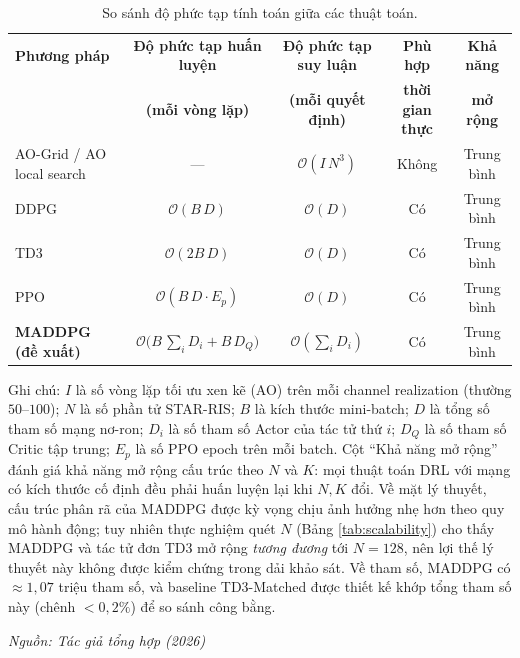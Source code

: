 \begin{table}[t]
\centering
\small
\caption{So sánh độ phức tạp tính toán giữa các thuật toán.}
\label{tab:complexity}
\setlength{\tabcolsep}{4pt}
\begin{tabular}{lcccc}
\toprule
\textbf{Phương pháp} & \textbf{Độ phức tạp huấn luyện} & \textbf{Độ phức tạp suy luận} & \textbf{Phù hợp} & \textbf{Khả năng} \\
                     & \textbf{(mỗi vòng lặp)}           & \textbf{(mỗi quyết định)}      & \textbf{thời gian thực} & \textbf{mở rộng} \\
\midrule
AO-Grid / AO local search           & ---                                  & $\mathcal{O}(I\, N^3)$            & Không  & Trung bình \\
DDPG \cite{lillicrap2016continuous} & $\mathcal{O}(B\, D)$                & $\mathcal{O}(D)$                  & Có    & Trung bình \\
TD3 \cite{fujimoto2018addressing}   & $\mathcal{O}(2B\, D)$               & $\mathcal{O}(D)$                  & Có    & Trung bình \\
PPO \cite{schulman2017proximal}     & $\mathcal{O}(B\, D \cdot E_p)$      & $\mathcal{O}(D)$                  & Có    & Trung bình \\
\textbf{MADDPG (đề xuất)}           & $\mathcal{O}\big(B\,\sum_i D_i + B\, D_Q\big)$ & $\mathcal{O}\!\left(\sum_i D_i\right)$ & Có & Trung bình \\
\bottomrule
\end{tabular}

\vspace{0.2em}
{\footnotesize Ghi chú: $I$ là số vòng lặp tối ưu xen kẽ (AO) trên mỗi channel realization (thường $50$--$100$); $N$ là số phần tử STAR-RIS; $B$ là kích thước mini-batch; $D$ là tổng số tham số mạng nơ-ron; $D_i$ là số tham số Actor của tác tử thứ $i$; $D_Q$ là số tham số Critic tập trung; $E_p$ là số PPO epoch trên mỗi batch. Cột ``Khả năng mở rộng'' đánh giá khả năng mở rộng cấu trúc theo $N$ và $K$: mọi thuật toán DRL với mạng có kích thước cố định đều phải huấn luyện lại khi $N,K$ đổi. Về mặt lý thuyết, cấu trúc phân rã của MADDPG được kỳ vọng chịu ảnh hưởng nhẹ hơn theo quy mô hành động; tuy nhiên thực nghiệm quét $N$ (Bảng \ref{tab:scalability}) cho thấy MADDPG và tác tử đơn TD3 mở rộng \emph{tương đương} tới $N=128$, nên lợi thế lý thuyết này không được kiểm chứng trong dải khảo sát. Về tham số, MADDPG có $\approx 1{,}07$ triệu tham số, và baseline TD3-Matched được thiết kế khớp tổng tham số này (chênh $<0{,}2\%$) để so sánh công bằng.\par}
\hfill {\footnotesize\itshape Nguồn: Tác giả tổng hợp (2026)}
\end{table}
